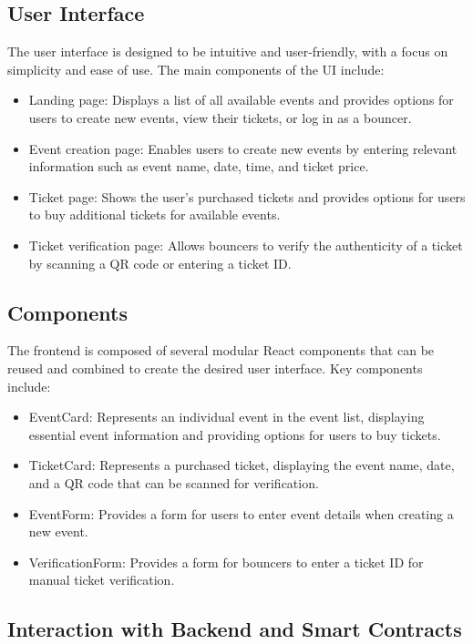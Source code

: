 \subsection{User Interface}

The user interface is designed to be intuitive and user-friendly, with a focus on simplicity and ease of use. The main components of the UI include:

\begin{itemize}
\item Landing page: Displays a list of all available events and provides options for users to create new events, view their tickets, or log in as a bouncer.
\item Event creation page: Enables users to create new events by entering relevant information such as event name, date, time, and ticket price.
\item Ticket page: Shows the user's purchased tickets and provides options for users to buy additional tickets for available events.
\item Ticket verification page: Allows bouncers to verify the authenticity of a ticket by scanning a QR code or entering a ticket ID.
\end{itemize}

\subsection{Components}

The frontend is composed of several modular React components that can be reused and combined to create the desired user interface. Key components include:

\begin{itemize}
\item EventCard: Represents an individual event in the event list, displaying essential event information and providing options for users to buy tickets.
\item TicketCard: Represents a purchased ticket, displaying the event name, date, and a QR code that can be scanned for verification.
\item EventForm: Provides a form for users to enter event details when creating a new event.
\item VerificationForm: Provides a form for bouncers to enter a ticket ID for manual ticket verification.
\end{itemize}

\subsection{Interaction with Backend and Smart Contracts}


